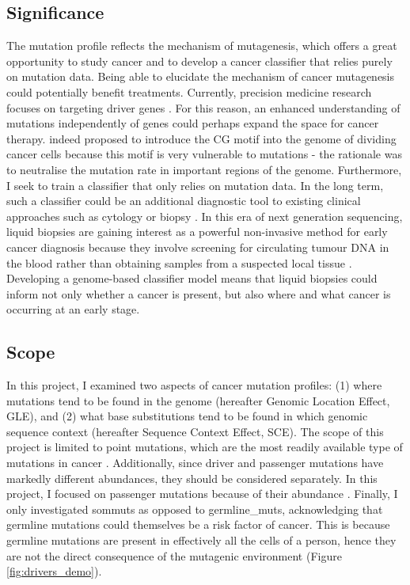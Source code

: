 

\subsection{Significance}
The mutation profile reflects the mechanism of mutagenesis, which offers a great opportunity to study cancer and to develop a cancer classifier that relies purely on mutation data. Being able to elucidate the mechanism of cancer mutagenesis could potentially benefit treatments. Currently, precision medicine research focuses on targeting driver genes \citep{Mukherjee2019Genomics-GuidedCancer}. For this reason, an enhanced understanding of mutations independently of genes could perhaps expand the space for cancer therapy. \citet{Chowdhury2018PresenceNucleotides} indeed proposed to introduce the CG motif into the genome of dividing cancer cells because this motif is very vulnerable to mutations - the rationale was to neutralise the mutation rate in important regions of the genome. Furthermore, I seek to train a \gls{classifier} that only relies on mutation data. In the long term, such a classifier could be an additional diagnostic tool to existing clinical approaches such as cytology or biopsy \citep{Stone1995Biopsy:Pitfalls}. In this era of next generation sequencing, liquid biopsies are gaining interest as a powerful non-invasive method for early cancer diagnosis because they involve screening for circulating tumour DNA in the blood rather than obtaining samples from a suspected local tissue \citep{Chen2019Next-generationDetection}. Developing a genome-based classifier model means that liquid biopsies could inform not only whether a cancer is present, but also where and what cancer is occurring at an early stage.  

\subsection{Scope}
In this project, I examined two aspects of cancer mutation profiles: (1) where mutations tend to be found in the genome (hereafter Genomic Location Effect, GLE), and (2) what base substitutions tend to be found in which genomic sequence context (hereafter Sequence Context Effect, SCE). The scope of this project is limited to point mutations, which are the most readily available type of mutations in cancer \citep{Alexandrov2020}. Additionally, since driver and passenger mutations have markedly different abundances, they should be considered separately. In this project, I focused on passenger mutations because of their abundance \citep{McFarland2014Tug-of-warProcesses}. Finally, I only investigated \glspl{sommut} as opposed to \glspl{germline_mut}, acknowledging that germline mutations could themselves be a risk factor of cancer. This is because germline mutations are present in effectively all the cells of a person, hence they are not the direct consequence of the mutagenic environment (Figure \ref{fig:drivers_demo}).

